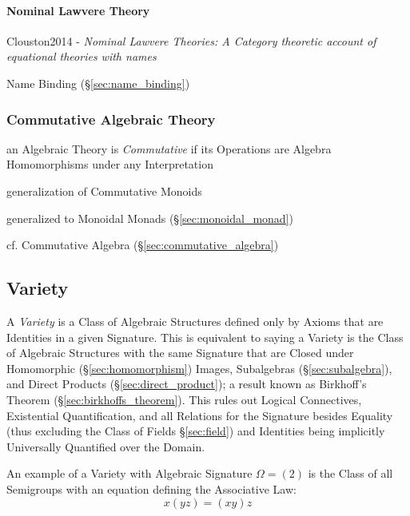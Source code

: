 \paragraph{Nominal Lawvere Theory}\label{sec:nominal_lawvere_theory}\hfill

Clouston2014 - \emph{Nominal Lawvere Theories: A Category theoretic account of
  equational theories with names}

Name Binding (\S\ref{sec:name_binding})



\subsubsection{Commutative Algebraic Theory}
\label{sec:commutative_algebraic_theory}

an Algebraic Theory is \emph{Commutative} if its Operations are Algebra
Homomorphisms under any Interpretation

generalization of Commutative Monoids

generalized to Monoidal Monads (\S\ref{sec:monoidal_monad})

\fist cf. Commutative Algebra (\S\ref{sec:commutative_algebra})



\subsection{Variety}\label{sec:variety}

A \emph{Variety} is a Class of Algebraic Structures defined only by
Axioms that are Identities in a given Signature. This is equivalent to
saying a Variety is the Class of Algebraic Structures with the same
Signature that are Closed under Homomorphic (\S\ref{sec:homomorphism})
Images, Subalgebras (\S\ref{sec:subalgebra}), and Direct Products
(\S\ref{sec:direct_product}); a result known as Birkhoff's Theorem
(\S\ref{sec:birkhoffs_theorem}). This rules out Logical Connectives,
Existential Quantification, and all Relations for the Signature
besides Equality (thus excluding the Class of Fields
\S\ref{sec:field}) and Identities being implicitly Universally
Quantified over the Domain.

An example of a Variety with Algebraic Signature $\Omega = (2)$ is the
Class of all Semigroups with an equation defining the Associative Law:
\[
    x(yz) = (xy)z
\]

